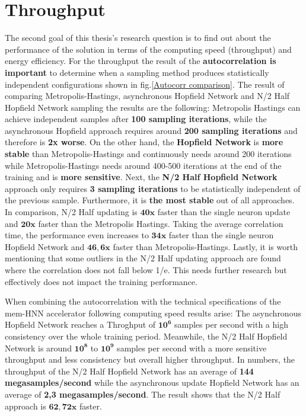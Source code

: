 \section{Throughput}

The second goal of this thesis's research question is to find out about the performance of the solution in terms of the 
computing speed (throughput) and energy efficiency. 
For the throughput the result of the \textbf{autocorrelation is important} to determine when a sampling method produces statistically independent configurations shown in fig.\ref{Autocorr comparison}.
The result of comparing Metropolis-Hastings, asynchronous Hopfield Network and N/2 Half Hopfield Network sampling the results are the following:
Metropolis Hastings can achieve independent samples after \textbf{100 sampling iterations}, while the asynchronous Hopfield approach requires around \textbf{200 sampling iterations} and therefore 
is \textbf{2x worse}. On the other hand, the \textbf{Hopfield Network} is \textbf{more stable} than Metropolis-Hastings and continuously needs around 200 iterations 
while Metropolis-Hastings needs around 400-500 iterations at the end of the training and is \textbf{more sensitive}. 
Next, the \textbf{N/2 Half Hopfield Network} approach only requires \textbf{3 sampling iterations} to be statistically independent of the previous sample.
Furthermore, it is \textbf{the most stable} out of all approaches. In comparison, N/2 Half updating is \(\mathbf{40x}\) faster than the single neuron
update and \(\mathbf{20x}\) faster than the Metropolis Hastings. 
Taking the average correlation time, the performance even increases to \(\mathbf{34x}\) faster than the single neuron Hopfield Network and \(\mathbf{46,6x}\)
faster than Metropolis-Hastings.
Lastly, it is worth mentioning that some outliers in the N/2 Half updating approach are found where 
the correlation does not fall below 1/e. This needs further research but effectively does not impact the training performance. 

When combining the autocorrelation with the technical specifications of the \ac{mem-HNN} accelerator following computing speed results arise:
The asynchronous Hopfield Network reaches a Throghput of \(\mathbf{10^6}\) samples per second with a high
consistency over the whole training period. 
Meanwhile, the N/2 Half Hopfield Network 
is around \(\mathbf{10^8}\) to \(\mathbf{10^9}\) samples per second with a more sensitive throughput and less consistency 
but overall higher throughput.
In numbers, the throughput of the N/2 Half Hopfield Network has an average of \textbf{144 megasamples/second} while the asynchronous update Hopfield Network has an average of \textbf{2,3 megasamples/second}.
The result shows that the N/2 Half approach is \(\mathbf{62,72x}\) faster. 


